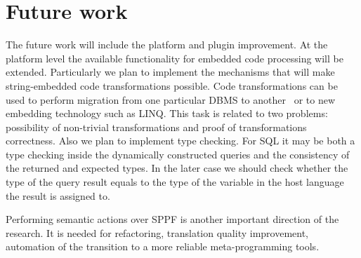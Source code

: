 \section{Future work}

The future work will include the platform and plugin improvement. At the platform level the available functionality for embedded code processing will be extended. Particularly we plan to implement the mechanisms that will make string-embedded code transformations possible. Code transformations can be used to perform migration from one particular DBMS to another~\cite{Migration:ref} or to new embedding technology such as LINQ. This task is related to two problems: possibility of non-trivial transformations and proof of transformations correctness. Also we plan to implement type checking. For SQL it may be both a type checking inside the dynamically constructed queries and the consistency of the returned and expected types. In the later case we should check whether the type of the query result equals to the type of the variable in the host language the result is assigned to.

Performing semantic actions over SPPF is another important direction of the research. It is needed for refactoring, translation quality improvement, automation of the transition to a more reliable meta-programming tools.